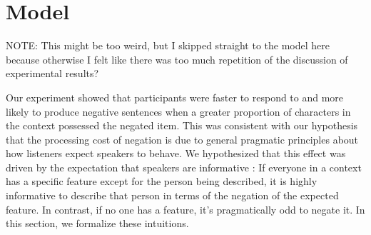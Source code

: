 \documentclass[man]{apa2}
\begin{document}
%
%

\section{Model}
NOTE: This might be too weird, but I skipped straight to the model here because otherwise I felt like there was too much repetition of the discussion of experimental results?  


Our experiment showed that participants were faster to respond to and more likely to produce negative sentences when a greater proportion of characters in the context possessed the negated item.  This was consistent with our hypothesis that the processing cost of negation is due to general pragmatic principles about how listeners expect speakers to behave.  
We hypothesized that this effect was driven by the expectation that speakers are informative \cite{grice1975,frank2012}: If everyone in a context has a specific feature except for the person being described, it is highly informative to describe that person in terms of the negation of the expected feature. In contrast, if no one has a feature, it's pragmatically odd to negate it. In this section, we formalize these intuitions.  
\end{document}
